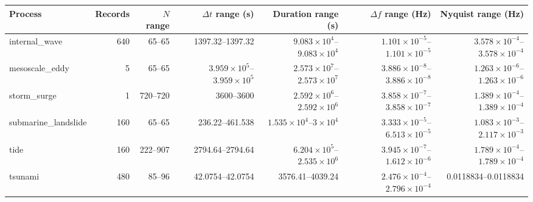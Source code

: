 \begin{tabular}{lrrrrrr}
\toprule
Process & Records & $N$ range & $\Delta t$ range (s) & Duration range (s) & $\Delta f$ range (Hz) & Nyquist range (Hz) \\
\midrule
internal\_wave & 640 & 65--65 & 1397.32--1397.32 & $9.083\times10^{4}$--$9.083\times10^{4}$ & $1.101\times10^{-5}$--$1.101\times10^{-5}$ & $3.578\times10^{-4}$--$3.578\times10^{-4}$ \\
mesoscale\_eddy & 5 & 65--65 & $3.959\times10^{5}$--$3.959\times10^{5}$ & $2.573\times10^{7}$--$2.573\times10^{7}$ & $3.886\times10^{-8}$--$3.886\times10^{-8}$ & $1.263\times10^{-6}$--$1.263\times10^{-6}$ \\
storm\_surge & 1 & 720--720 & 3600--3600 & $2.592\times10^{6}$--$2.592\times10^{6}$ & $3.858\times10^{-7}$--$3.858\times10^{-7}$ & $1.389\times10^{-4}$--$1.389\times10^{-4}$ \\
submarine\_landslide & 160 & 65--65 & 236.22--461.538 & $1.535\times10^{4}$--$3\times10^{4}$ & $3.333\times10^{-5}$--$6.513\times10^{-5}$ & $1.083\times10^{-3}$--$2.117\times10^{-3}$ \\
tide & 160 & 222--907 & 2794.64--2794.64 & $6.204\times10^{5}$--$2.535\times10^{6}$ & $3.945\times10^{-7}$--$1.612\times10^{-6}$ & $1.789\times10^{-4}$--$1.789\times10^{-4}$ \\
tsunami & 480 & 85--96 & 42.0754--42.0754 & 3576.41--4039.24 & $2.476\times10^{-4}$--$2.796\times10^{-4}$ & 0.0118834--0.0118834 \\
\bottomrule
\end{tabular}
